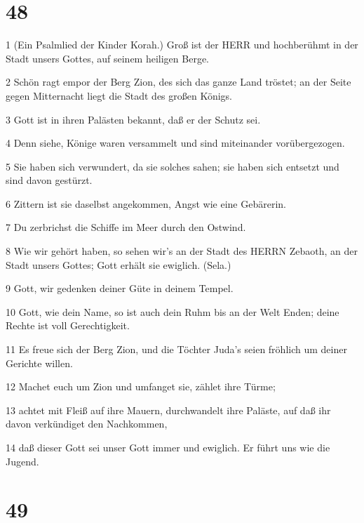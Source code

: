\chapter{48}

\par 1 (Ein Psalmlied der Kinder Korah.) Groß ist der HERR und hochberühmt in der Stadt unsers Gottes, auf seinem heiligen Berge.
\par 2 Schön ragt empor der Berg Zion, des sich das ganze Land tröstet; an der Seite gegen Mitternacht liegt die Stadt des großen Königs.
\par 3 Gott ist in ihren Palästen bekannt, daß er der Schutz sei.
\par 4 Denn siehe, Könige waren versammelt und sind miteinander vorübergezogen.
\par 5 Sie haben sich verwundert, da sie solches sahen; sie haben sich entsetzt und sind davon gestürzt.
\par 6 Zittern ist sie daselbst angekommen, Angst wie eine Gebärerin.
\par 7 Du zerbrichst die Schiffe im Meer durch den Ostwind.
\par 8 Wie wir gehört haben, so sehen wir's an der Stadt des HERRN Zebaoth, an der Stadt unsers Gottes; Gott erhält sie ewiglich. (Sela.)
\par 9 Gott, wir gedenken deiner Güte in deinem Tempel.
\par 10 Gott, wie dein Name, so ist auch dein Ruhm bis an der Welt Enden; deine Rechte ist voll Gerechtigkeit.
\par 11 Es freue sich der Berg Zion, und die Töchter Juda's seien fröhlich um deiner Gerichte willen.
\par 12 Machet euch um Zion und umfanget sie, zählet ihre Türme;
\par 13 achtet mit Fleiß auf ihre Mauern, durchwandelt ihre Paläste, auf daß ihr davon verkündiget den Nachkommen,
\par 14 daß dieser Gott sei unser Gott immer und ewiglich. Er führt uns wie die Jugend.

\chapter{49}

